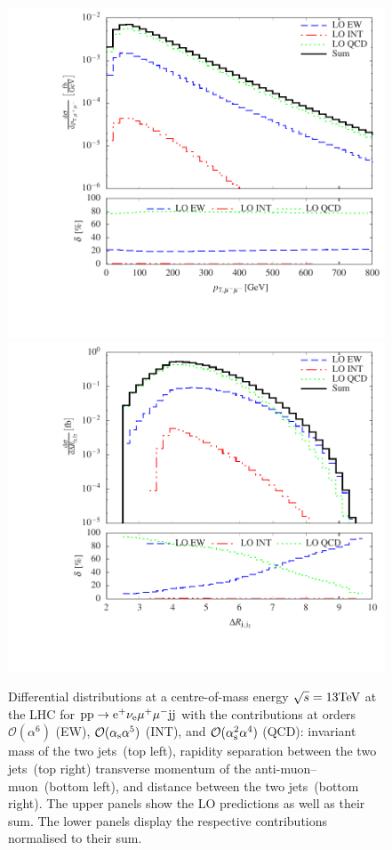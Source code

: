 \documentclass[11pt]{cernrep}
\begin{document}
\begin{figure}[htbp]
\begin{center}
   \includegraphics[scale=0.5]{figs/histogram_transverse_momentum_muamu}
   \includegraphics[scale=0.5]{figs/histogram_distance_djj12}
\caption{Differential distributions at a centre-of-mass energy $\sqrt{s}=13{\rm TeV}$ at the LHC for ${\rm p} {\rm p} \to {\rm e}^+  \nu_{\rm e}  \mu^+ \mu^- {\rm j} {\rm j}$ 
with the contributions at orders $\mathcal{O} (\alpha^6)$ (EW), $\mathcal{O} (\alpha_{\rm s}\alpha^5)$ (INT), and $\mathcal{O} (\alpha_{\rm s}^2\alpha^4)$ (QCD): 
                invariant mass of the two jets~(top left),
                rapidity separation between the two jets~(top right)
                transverse momentum of the anti-muon--muon~(bottom left), and
                distance between the two jets~(bottom right).
                The upper panels show the LO predictions as well as their sum.
                The lower panels display the respective contributions normalised to their sum.}
\label{fig:diffcontr}
\end{center}
\end{figure}
\end{document}
